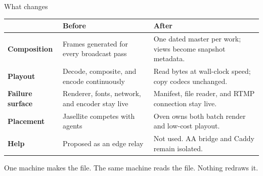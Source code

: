 \documentclass[11pt,letterpaper,landscape]{article}
\begin{document}
\vspace{0.45em}
{\acbold\fontsize{14pt}{16pt}\selectfont\color{acdark}What changes}\par
\vspace{0.22em}
\begin{tabularx}{\textwidth}{@{}>{\bfseries}p{1.28in} X X@{}}
 & Before & After \\
\midrule
Composition & Frames generated for every broadcast pass & One dated master per work; views become snapshot metadata. \\
Playout & Decode, composite, and encode continuously & Read bytes at wall-clock speed; copy codecs unchanged. \\
Failure surface & Renderer, fonts, network, and encoder stay live & Manifest, file reader, and RTMP connection stay live. \\
Placement & Jasellite competes with agents & Oven owns both batch render and low-cost playout. \\
Help & Proposed as an edge relay & Not used. AA bridge and Caddy remain isolated. \\
\bottomrule
\end{tabularx}

\vfill
\begin{center}
{\aclight\fontsize{15pt}{17pt}\selectfont\color{acpink}
One machine makes the file. The same machine reads the file. Nothing redraws it.}
\end{center}
\end{document}
